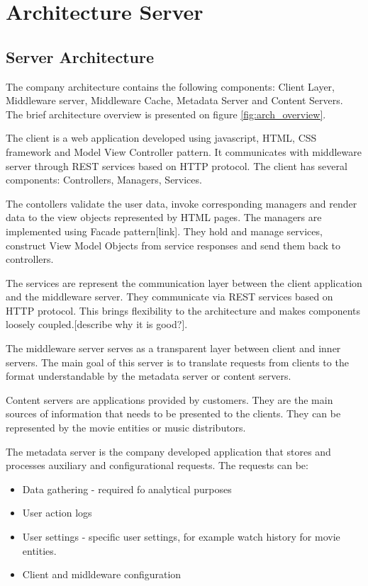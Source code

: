 \section{Architecture Server}

\subsection{Server Architecture}

The company architecture contains the following components: Client Layer, Middleware server, Middleware Cache, Metadata Server and Content Servers. The brief architecture overview is presented on figure \ref{fig:arch_overview}. 

The client is a web application developed using javascript, HTML, CSS framework and Model View Controller pattern. It communicates with middleware server through REST services based on HTTP protocol. The client has several components: Controllers, Managers, Services. 

The contollers validate the user data, invoke corresponding managers and render data to the view objects represented by HTML pages. The managers are implemented using Facade pattern[link]. They hold and manage services, construct View Model Objects from service responses and send them back to controllers. 

The services are represent the communication layer between the client application and the middleware server. They communicate via REST services based on HTTP protocol. This brings flexibility to the architecture and makes components loosely coupled.[describe why it is good?]. 

The middleware server serves as a transparent layer between client and inner servers. The main goal of this server is to translate requests from clients to the format understandable by the metadata server or content servers.  

Content servers are applications provided by customers. They are the main sources of information that needs to be presented to the clients. They can be represented by the movie entities or music distributors.

The metadata server is the company developed application that stores and processes auxiliary and configurational requests. The requests can be: 

\begin{itemize}
	\item Data gathering - required fo analytical purposes
	\item User action logs 
	\item User settings - specific user settings, for example watch history for movie entities.
	\item Client and midldeware configuration
\end{itemize} 

